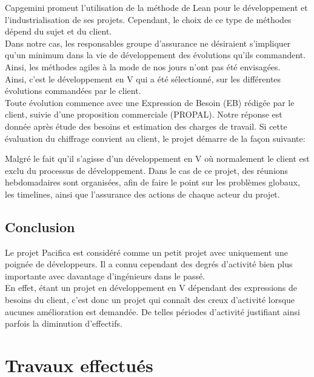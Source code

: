 \documentclass{rapport}
\begin{document}
Capgemini promeut l'utilisation de la méthode de Lean pour le développement et l'industrialisation de ses projets. Cependant, le choix de ce type de méthodes dépend du sujet et du client.\\ 
Dans notre cas, les responsables groupe d'assurance ne désiraient s'impliquer qu'un minimum dans la vie de développement des évolutions qu'ils commandent. Ainsi, les méthodes agiles à la mode de nos jours n'ont pas été envisagées.\\

Ainsi, c'est le développement en V qui a été sélectionné, sur les différentes évolutions commandées par le client.\\


Toute évolution commence avec une Expression de Besoin (EB) rédigée par le client, suivie d'une proposition commerciale (PROPAL). Notre réponse est donnée après étude des besoins et estimation des charges de travail. Si cette évaluation du chiffrage convient au client, le projet démarre de la façon suivante:


Malgré le fait qu'il s'agisse d'un développement en V où normalement le client est exclu du processus de développement. Dans le cas de ce projet, des réunions hebdomadaires sont organisées, afin de faire le point sur les problèmes globaux, les timelines, ainsi que l'assurance des actions de chaque acteur du projet.

\subsection*{Conclusion}

Le projet Pacifica est considéré comme un petit projet avec uniquement une poignée de développeurs. Il a connu cependant des degrés d'activité bien plus importante avec davantage d'ingénieurs dans le passé. \\
En effet, étant un projet en développement en V dépendant des expressions de besoins du client, c'est donc un projet qui connaît des creux d'activité lorsque aucunes amélioration est demandée. De telles périodes d'activité justifiant ainsi parfois la diminution d'effectifs.\\


\newpage

\section{Travaux effectués}
\end{document}

